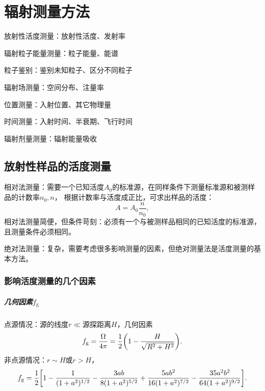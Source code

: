 \chapter{辐射测量方法}
\begin{compactitem}
	\item 放射性活度测量：放射性活度、发射率
	\item 辐射粒子能量测量：粒子能量、能谱
	\item 粒子鉴别：鉴别未知粒子、区分不同粒子
	\item 辐射场测量：空间分布、注量率
	\begin{compactitem}
		\item 位置测量：入射位置、其它物理量
		\item 时间测量：入射时间、半衰期、飞行时间
		\item 辐射剂量测量：辐射能量吸收
	\end{compactitem}
\end{compactitem}

\section{放射性样品的活度测量}

相对法测量：需要一个已知活度$A_0$的标准源，在同样条件下测量标准源和被测样品的计数率$n_0,n$， 根据计数率与活度成正比，可求出样品的活度：
\begin{equation}\label{eq:nrd-relative-activity}
	A = A_0\frac n{n_0},
\end{equation}
相对法测量简便，但条件苛刻：必须有一个与被测样品相同的已知活度的标准源，且测量条件必须相同。

绝对法测量：复杂，需要考虑很多影响测量的因素，但绝对测量法是活度测量的基本方法。

\subsection{影响活度测量的几个因素}

\paragraph{几何因素$f_{\mathrm{g}}$}
点源情况：源的线度$r \ll$源探距离$H$，几何因素
\begin{equation}\label{eq:nrd-point-source-geometric-factor}
	f_{\mathrm{g}} = \frac\Omega{4\pi} = \frac12\biggl(1 - \frac H{\sqrt{R^2 + H^2}}\biggr).
\end{equation}
非点源情况：$r \sim H$或$r > H$，
\begin{equation}\label{eq:nrd-extended-source-geometric-factor}
	f_{\mathrm{g}} = \frac12\biggl[1 - \frac1{(1 + a^2)^{1/2}} - \frac{3ab}{8(1 + a^2)^{5/2}} + \frac{5ab^2}{16(1 + a^2)^{7/2}} - \frac{35a^2b^2}{64(1 + a^2)^{9/2}}\biggr].
\end{equation}
